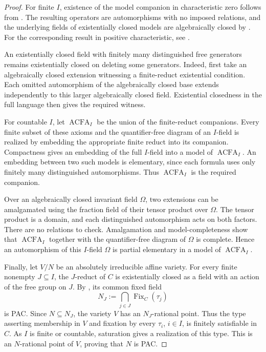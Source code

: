 \documentclass[11pt,a4paper]{amsart}
\theoremstyle{definition}
\DeclareMathOperator{\Fix}{Fix}
\begin{document}
\begin{proof}
For finite $I$, existence of the model companion in characteristic
zero follows from \cite[Corollary~4.7]{MS}. The resulting operators are
automorphisms with no imposed relations, and the underlying
fields of existentially closed models are algebraically closed
by \cite[Theorem~4.6]{MS}. For the corresponding result in
positive characteristic, see \cite[Section~4.2]{BHKK}.

An existentially closed field with finitely many distinguished free
generators remains existentially closed on deleting some generators.
Indeed, first take an algebraically closed extension witnessing a
finite-reduct existential condition. Each omitted automorphism of the
algebraically closed base extends independently to this larger
algebraically closed field. Existential closedness in the full language
then gives the required witness.

For countable $I$, let $\operatorname{ACFA}_I$ be the union of the finite-reduct
companions. Every finite subset of these axioms and the quantifier-free
diagram of an $I$-field is realized by embedding the appropriate finite
reduct into its companion. Compactness gives an embedding of the full
$I$-field into a model of $\operatorname{ACFA}_I$. An embedding between two such models
is elementary, since each formula uses only finitely many distinguished
automorphisms. Thus $\operatorname{ACFA}_I$ is the required companion.

Over an algebraically closed invariant field $\Omega$, two extensions
can be amalgamated using the fraction field of their tensor product
over $\Omega$. The tensor product is a domain, and each distinguished
automorphism acts on both factors. There are no relations to check.
Amalgamation and model-completeness show that $\operatorname{ACFA}_I$ together with the
quantifier-free diagram of $\Omega$ is complete. Hence an automorphism
of this $I$-field $\Omega$ is partial elementary in a model of $\operatorname{ACFA}_I$.

Finally, let $V/N$ be an absolutely irreducible affine variety.
For every finite nonempty $J\subseteq I$, the $J$-reduct of $C$
is existentially closed as a field with an action of the free
group on $J$. By \cite[Proposition~2.4]{BKTorsion}, its common
fixed field
\[
N_J:=\bigcap_{j\in J}\Fix_C(\tau_j)
\]
is PAC. Since $N\subseteq N_J$, the variety $V$ has an
$N_J$-rational point. Thus the type asserting membership in
$V$ and fixation by every $\tau_i$, $i\in I$, is finitely
satisfiable in $C$. As $I$ is finite or countable, saturation
gives a realization of this type. This is an $N$-rational
point of $V$, proving that $N$ is PAC.
\end{proof}
\end{document}

